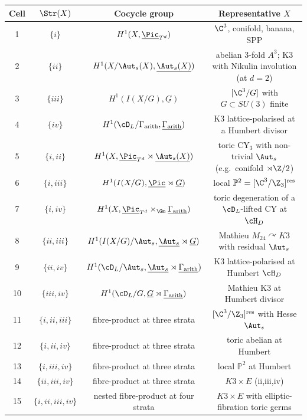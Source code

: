 \begin{center}
\begin{tabular}{|c|c|c|c|}
\hline
Cell & $\Str(X)$ & Cocycle group & Representative $X$ \\
\hline
1 & $\{i\}$ & $H^{1}(X,\underline{\Pic}_{T^{d}})$ & $\C^{3}$, conifold, banana, SPP \\
2 & $\{ii\}$ & $H^{1}(X/\Aut_{s}(X),\underline{\Aut_{s}(X)})$ & abelian 3-fold $A^{3}$; K3 with Nikulin involution (at $d=2$) \\
3 & $\{iii\}$ & $H^{1}(I(X/G),\underline{G})$ & $[\C^{3}/G]$ with $G\subset SU(3)$ finite \\
4 & $\{iv\}$ & $H^{1}(\cD_{L}/\Gamma_{\mathrm{arith}},\underline{\Gamma_{\mathrm{arith}}})$ & K3 lattice-polarised at a Humbert divisor \\
\hline
5 & $\{i,ii\}$ & $H^{1}(X,\underline{\Pic}_{T^{d}}\rtimes\underline{\Aut_{s}(X)})$ & toric CY$_{3}$ with non-trivial $\Aut_{s}$ (e.g.\ conifold $\rtimes\Z/2$) \\
6 & $\{i,iii\}$ & $H^{1}(I(X/G),\underline{\Pic}\rtimes\underline{G})$ & local $\mathbb{P}^{2}=[\C^{3}/\Z_{3}]^{\mathrm{res}}$ \\
7 & $\{i,iv\}$ & $H^{1}(X,\underline{\Pic}_{T^{d}}\times_{\Gm}\underline{\Gamma_{\mathrm{arith}}})$ & toric degeneration of a $\cD_{L}$-lifted CY at $\cH_{D}$ \\
8 & $\{ii,iii\}$ & $H^{1}(I(X/G)/\Aut_{s},\underline{\Aut_{s}}\rtimes\underline{G})$ & Mathieu $M_{24}\curvearrowright K3$ with residual $\Aut_{s}$ \\
9 & $\{ii,iv\}$ & $H^{1}(\cD_{L}/\Aut_{s},\underline{\Aut_{s}}\rtimes\underline{\Gamma_{\mathrm{arith}}})$ & K3 lattice-polarised at Humbert $\cH_{D}$ \\
10 & $\{iii,iv\}$ & $H^{1}(\cD_{L}/G,\underline{G}\rtimes\underline{\Gamma_{\mathrm{arith}}})$ & Mathieu K3 at Humbert divisor \\
\hline
11 & $\{i,ii,iii\}$ & fibre-product at three strata & $[\C^{3}/\Z_{3}]^{\mathrm{res}}$ with Hesse $\Aut_{s}$ \\
12 & $\{i,ii,iv\}$ & fibre-product at three strata & toric abelian at Humbert \\
13 & $\{i,iii,iv\}$ & fibre-product at three strata & local $\mathbb{P}^{2}$ at Humbert \\
14 & $\{ii,iii,iv\}$ & fibre-product at three strata & $K3\times E$ (ii,iii,iv) \\
\hline
15 & $\{i,ii,iii,iv\}$ & nested fibre-product at four strata & $K3\times E$ with elliptic-fibration toric germs \\
\hline
\end{tabular}
\end{center}

